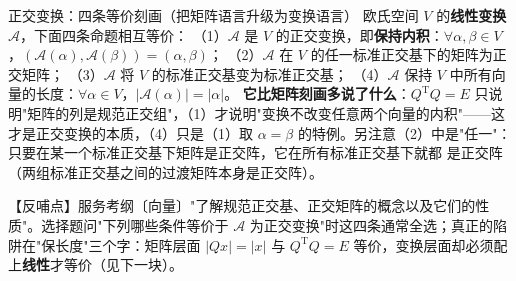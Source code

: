 %
%
%
%


\begin{fdeep}{正交变换：四条等价刻画（把矩阵语言升级为变换语言）}
欧氏空间 $V$ 的\textbf{线性变换} $\mathscr{A}$，下面四条命题相互等价：
（1）$\mathscr{A}$ 是 $V$ 的正交变换，即\textbf{保持内积}：$\forall\alpha,\beta\in V$，$(\mathscr{A}(\alpha),\mathscr{A}(\beta))=(\alpha,\beta)$；
（2）$\mathscr{A}$ 在 $V$ 的任一标准正交基下的矩阵为正交矩阵；
（3）$\mathscr{A}$ 将 $V$ 的标准正交基变为标准正交基；
（4）$\mathscr{A}$ 保持 $V$ 中所有向量的长度：$\forall\alpha\in V$，$|\mathscr{A}(\alpha)|=|\alpha|$。
\textbf{它比矩阵刻画多说了什么}：$Q^{\mathrm T}Q=E$ 只说明"矩阵的列是规范正交组"，（1）才说明"变换不改变任意两个向量的内积"——这才是正交变换的本质，（4）只是（1）取 $\alpha=\beta$ 的特例。另注意（2）中是"任一"：只要在某一个标准正交基下矩阵是正交阵，它在所有标准正交基下就都 是正交阵（两组标准正交基之间的过渡矩阵本身是正交阵）。

【反哺点】服务考纲〔向量〕"了解规范正交基、正交矩阵的概念以及它们的性质"。选择题问"下列哪些条件等价于 $\mathscr{A}$ 为正交变换"时这四条通常全选；真正的陷阱在"保长度"三个字：矩阵层面 $|Qx|=|x|$ 与 $Q^{\mathrm T}Q=E$ 等价，变换层面却必须配上\textbf{线性}才等价（见下一块）。
\end{fdeep}


